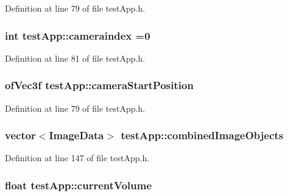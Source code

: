 Definition at line 79 of file test\-App.\-h.

\hypertarget{classtest_app_a4ca3a51642dedbf37f2b9f6ef96510c7}{
\subsubsection[{cameraindex}]{\setlength{\rightskip}{0pt plus 5cm}int test\-App\-::cameraindex =0}}\label{classtest_app_a4ca3a51642dedbf37f2b9f6ef96510c7}


Definition at line 81 of file test\-App.\-h.

\hypertarget{classtest_app_ac01013264b9988207e7fd9e0a486ff2f}{
\subsubsection[{camera\-Start\-Position}]{\setlength{\rightskip}{0pt plus 5cm}of\-Vec3f test\-App\-::camera\-Start\-Position}}\label{classtest_app_ac01013264b9988207e7fd9e0a486ff2f}


Definition at line 79 of file test\-App.\-h.

\hypertarget{classtest_app_aced9b8a8419c8465877c2c9cd43f8934}{
\subsubsection[{combined\-Image\-Objects}]{\setlength{\rightskip}{0pt plus 5cm}vector$<${\bf Image\-Data}$>$ test\-App\-::combined\-Image\-Objects}}\label{classtest_app_aced9b8a8419c8465877c2c9cd43f8934}


Definition at line 147 of file test\-App.\-h.

\hypertarget{classtest_app_a51c20c5432d9f6b06f719526d9a34ee6}{
\subsubsection[{current\-Volume}]{\setlength{\rightskip}{0pt plus 5cm}float test\-App\-::current\-Volume}}\label{classtest_app_a51c20c5432d9f6b06f719526d9a34ee6}


